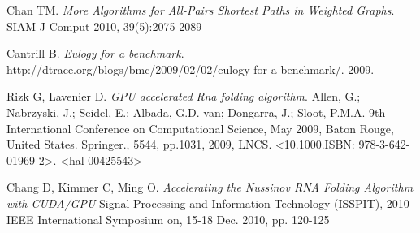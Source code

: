 \documentclass[12pt]{article}
\begin{document}
\begin{thebibliography}{56}
Chan TM.
\textit{More Algorithms for All-Pairs Shortest Paths in Weighted
Graphs}.
SIAM J Comput 2010, 39(5):2075-2089

Cantrill B.
\textit{Eulogy for a benchmark}.
http://dtrace.org/blogs/bmc/2009/02/02/eulogy-for-a-benchmark/.
2009.

Rizk G, Lavenier D.
\textit{GPU accelerated Rna folding algorithm}.
Allen, G.; Nabrzyski, J.; Seidel, E.; Albada, G.D. van; Dongarra, J.; Sloot, P.M.A. 9th International Conference on Computational Science, May 2009, Baton Rouge, United States. Springer., 5544, pp.1031, 2009, LNCS. <10.1000.ISBN: 978-3-642-01969-2>. <hal-00425543>

Chang D, Kimmer C, Ming O.
\textit{Accelerating the Nussinov RNA Folding Algorithm with CUDA/GPU}
Signal Processing and Information Technology (ISSPIT), 2010 IEEE International Symposium on, 15-18 Dec. 2010, pp. 120-125
\end{thebibliography}
\end{document}
